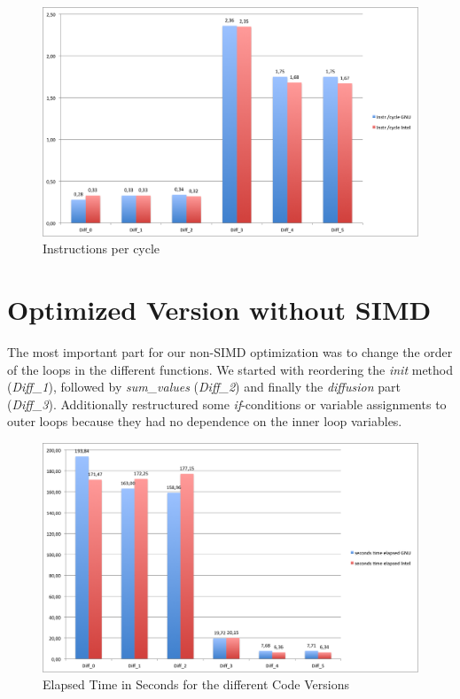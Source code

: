 \documentclass[12pt,a4paper]{article}
\begin{document}
\begin{figure}
	\centering
	\includegraphics[width=1.0\linewidth]{"Benchmark/Instrcycle"}
	\caption{Instructions per cycle}
	\label{fig:instrcycle}
\end{figure}


\section{Optimized Version without SIMD}

The most important part for our non-SIMD optimization was to change the order of the loops in the different functions. We started with reordering the \emph{init} method (\emph{Diff\_1}), followed by \emph{sum\_values} (\emph{Diff\_2}) and finally the \emph{diffusion} part (\emph{Diff\_3}). Additionally restructured some \emph{if}-conditions or variable assignments to outer loops because they had no dependence on the inner loop variables.  

 
\begin{figure}
	\centering
	\includegraphics[width=1.0\linewidth]{"Benchmark/seconds"}
	\caption{Elapsed Time in Seconds for the different Code Versions}
	\label{fig:seconds}
\end{figure}
\end{document}
